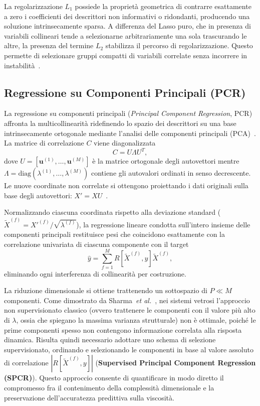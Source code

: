 \documentclass[../main.tex]{subfiles}
\begin{document}
	La regolarizzazione $L_1$ possiede la proprietà geometrica di contrarre esattamente a zero i coefficienti dei descrittori non informativi o ridondanti, producendo una soluzione intrinsecamente sparsa. A differenza del Lasso puro, che in presenza di variabili collineari tende a selezionarne arbitrariamente una sola trascurando le altre, la presenza del termine $L_2$ stabilizza il percorso di regolarizzazione. Questo permette di selezionare gruppi compatti di variabili correlate senza incorrere in instabilità~\cite{hastieElementsStatisticalLearning2009}.
	
	\subsection{Regressione su Componenti Principali (PCR)}
	\label{sec:pcr_intro}
	
	La regressione su componenti principali (\textit{Principal Component Regression}, PCR) affronta la multicollinearità ridefinendo lo spazio dei descrittori su una base intrinsecamente ortogonale mediante l'analisi delle componenti principali (PCA)~\cite{sharmaInterpretabilityLinearRegression2026}. La matrice di correlazione $C$ viene diagonalizzata
	\begin{equation}
		C = U \Lambda U^T ,
	\end{equation}
	dove $U = [\mathbf{u}^{(1)}, \dots, \mathbf{u}^{(M)}]$ è la matrice ortogonale degli autovettori mentre $\Lambda = \text{diag}(\lambda^{(1)}, \dots, \lambda^{(M)})$ contiene gli autovalori ordinati in senso decrescente. Le nuove coordinate non correlate si ottengono proiettando i dati originali sulla base degli autovettori: $X' = X U$~\cite{sharmaInterpretabilityLinearRegression2026}.
	
	Normalizzando ciascuna coordinata rispetto alla deviazione standard ($\tilde{X}^{(f)} = X'^{(f)}/\sqrt{\lambda^{(f)}}$), la regressione lineare condotta sull'intero insieme delle componenti principali restituisce pesi che coincidono esattamente con la correlazione univariata di ciascuna componente con il target
	\begin{equation}
		\hat{y} = \sum_{f=1}^M R[\tilde{X}^{(f)}, y] \tilde{X}^{(f)} ,
	\end{equation}
	eliminando ogni interferenza di collinearità per costruzione.
	
	La riduzione dimensionale si ottiene trattenendo un sottospazio di $P \ll M$ componenti. Come dimostrato da Sharma~\textit{et al.}~\cite{sharmaInterpretabilityLinearRegression2026}, nei sistemi vetrosi l'approccio non supervisionato classico (ovvero trattenere le componenti con il valore più alto di $\lambda$, ossia che spiegano la massima varianza strutturale) non è ottimale, poiché le prime componenti spesso non contengono informazione correlata alla risposta dinamica. Risulta quindi necessario adottare uno schema di selezione supervisionato, ordinando e selezionando le componenti in base al valore assoluto di correlazione $|R[\tilde{X}^{(f)}, y]|$ (\textbf{Supervised Principal Component Regression (SPCR)}). Questo approccio consente di quantificare in modo diretto il compromesso fra il contenimento della complessità dimensionale e la preservazione dell'accuratezza predittiva sulla viscosità.
	
\end{document}
